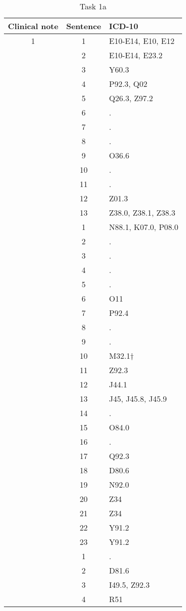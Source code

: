 \begin{table}[htbp] \footnotesize \center
\caption{Task 1a\label{tab:task1a}}
\begin{tabular}{c c l}
    \toprule
    Clinical note & Sentence & ICD-10 \\
    \midrule
	1 & 1 & E10-E14, E10, E12 \\
	 & 2 & E10-E14, E23.2 \\
	 & 3 & Y60.3 \\
	 & 4 & P92.3, Q02 \\
	 & 5 & Q26.3, Z97.2 \\
	 & 6 & . \\
	 & 7 & . \\
	 & 8 & . \\
	 & 9 & O36.6 \\
	 & 10 & . \\
	 & 11 & . \\
	 & 12 & Z01.3 \\
	 & 13 & Z38.0, Z38.1, Z38.3 \\
	\addlinespace
	2 & 1 & N88.1, K07.0, P08.0 \\
	 & 2 & . \\
	 & 3 & . \\
	 & 4 & . \\
	 & 5 & . \\
	 & 6 & O11 \\
	 & 7 & P92.4 \\
	 & 8 & . \\
	 & 9 & . \\
	 & 10 & M32.1† \\
	 & 11 & Z92.3 \\
	 & 12 & J44.1 \\
	 & 13 & J45, J45.8, J45.9 \\
	 & 14 & . \\
	 & 15 & O84.0 \\
	 & 16 & . \\
	 & 17 & Q92.3 \\
	 & 18 & D80.6 \\
	 & 19 & N92.0 \\
	 & 20 & Z34 \\
	 & 21 & Z34 \\
	 & 22 & Y91.2 \\
	 & 23 & Y91.2 \\
	\addlinespace
	3 & 1 & . \\
	 & 2 & D81.6 \\
	 & 3 & I49.5, Z92.3 \\
	 & 4 & R51 \\

\end{tabular}
\end{table}
